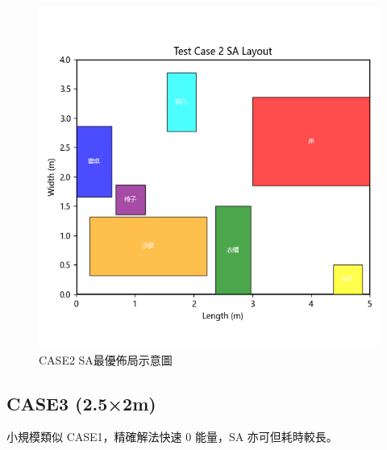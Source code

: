 \documentclass[conference]{IEEEtran}
\begin{document}
\begin{figure}[!htbp]
    \centering
    \includegraphics[width=\columnwidth]{sa_layout_test_case_2.png} 
    \caption{CASE2 SA最優佈局示意圖}
    \label{fig:case1_exact_solver} %
\end{figure}

\FloatBarrier %

\subsection{CASE3 (2.5×2m)}
小規模類似 CASE1，精確解法快速 0 能量，SA 亦可但耗時較長。
\end{document}
